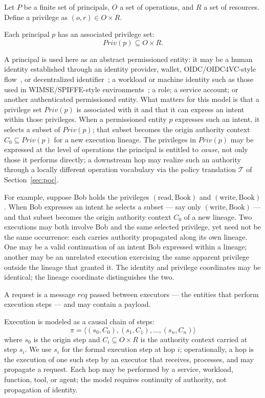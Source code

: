 \documentclass[11pt]{article}
\begin{document}
Let $P$ be a finite set of principals, $O$ a set of operations, and $R$ a set of resources.
Define a privilege as $(o, r) \in O \times R$.

Each principal $p$ has an associated privilege set:
\[
Priv(p) \subseteq O \times R.
\]

A principal is used here as an abstract permissioned entity: it may be a human
identity established through an identity provider, wallet, OIDC/OIDC4VC-style
flow~\cite{openidconnect2014,openid4vc2024}, or decentralized
identifier~\cite{didcore2022}; a workload or machine identity such as those
used in WIMSE/SPIFFE-style environments~\cite{wimse2024,spiffe2017}; a role; a
service account; or another authenticated permissioned entity. What matters for this model is
that a privilege set $Priv(p)$ is associated with it and that it can express an
intent within those privileges. When a permissioned entity $p$ expresses such an
intent, it selects a subset of $Priv(p)$; that subset becomes the origin
authority context $C_0 \subseteq Priv(p)$ for a new execution lineage. The
privileges in $Priv(p)$ may be expressed at the level of operations the principal
is entitled to \emph{cause}, not only those it performs directly; a downstream hop
may realize such an authority through a locally different operation vocabulary via
the policy translation $\mathcal{T}$ of Section~\ref{sec:poc}.

For example, suppose Bob holds the privileges $(\text{read},\text{Book})$ and
$(\text{write},\text{Book})$. When Bob expresses an intent he selects a subset ---
say only $(\text{write},\text{Book})$ --- and that subset becomes the origin
authority context $C_0$ of a new lineage. Two executions may both involve Bob and
the same selected privilege, yet need not be the same occurrence: each carries
authority propagated along its own lineage. One may be a valid continuation of an
intent Bob expressed within a lineage; another may be an unrelated execution
exercising the same apparent privilege outside the lineage that granted it. The identity and privilege coordinates may be identical; the
lineage coordinate distinguishes the two.

A request is a message $req$ passed between executors --- the entities that
perform execution steps --- and may contain a payload.

Execution is modeled as a causal chain of steps:
\[
\pi = \langle (s_0, C_0), (s_1, C_1), \dots, (s_n, C_n) \rangle
\]
where $s_0$ is the origin step and $C_i \subseteq O \times R$ is the authority
context carried at step $s_i$.
We use $s_i$ for the formal execution step at hop $i$; operationally, a hop is
the execution of one such step by an executor that receives, processes, and may
propagate a request. Each hop may be performed by a service, workload, function,
tool, or agent; the model requires continuity of authority, not propagation of
identity.
\end{document}

